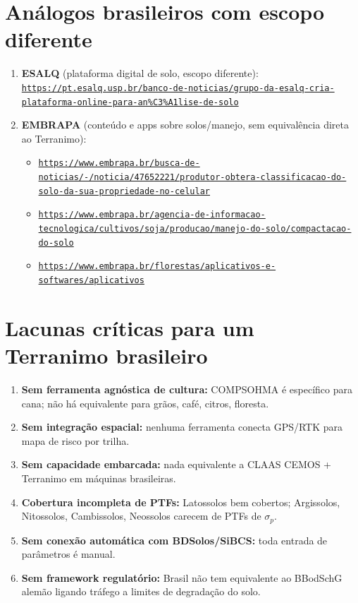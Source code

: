\documentclass[12pt,a4paper]{article}
\newcommand{\Section}[1]{\needspace{12\baselineskip}\section{#1}}
\newcommand{\Link}[1]{\href{#1}{\nolinkurl{#1}}}
\newenvironment{NoBreakEnumerate}
{\begin{samepage}\begin{enumerate}}
{\end{enumerate}\end{samepage}}
\newenvironment{NoBreakItemize}
{\begin{samepage}\begin{itemize}}
{\end{itemize}\end{samepage}}
\begin{document}
\Section{Análogos brasileiros com escopo diferente}
\begin{NoBreakEnumerate}
  \item \textbf{ESALQ} (plataforma digital de solo, escopo diferente):\\
  \Link{https://pt.esalq.usp.br/banco-de-noticias/grupo-da-esalq-cria-plataforma-online-para-an\%C3\%A1lise-de-solo}

  \item \textbf{EMBRAPA} (conteúdo e apps sobre solos/manejo, sem equivalência direta ao Terranimo):
  \begin{NoBreakItemize}
    \item \Link{https://www.embrapa.br/busca-de-noticias/-/noticia/47652221/produtor-obtera-classificacao-do-solo-da-sua-propriedade-no-celular}
    \item \Link{https://www.embrapa.br/agencia-de-informacao-tecnologica/cultivos/soja/producao/manejo-do-solo/compactacao-do-solo}
    \item \Link{https://www.embrapa.br/florestas/aplicativos-e-softwares/aplicativos}
  \end{NoBreakItemize}
\end{NoBreakEnumerate}

\Section{Lacunas críticas para um Terranimo brasileiro}

\begin{NoBreakEnumerate}
  \item \textbf{Sem ferramenta agnóstica de cultura:} COMPSOHMA é específico para cana; não há equivalente para grãos, café, citros, floresta.
  \item \textbf{Sem integração espacial:} nenhuma ferramenta conecta GPS/RTK para mapa de risco por trilha.
  \item \textbf{Sem capacidade embarcada:} nada equivalente a CLAAS CEMOS + Terranimo em máquinas brasileiras.
  \item \textbf{Cobertura incompleta de PTFs:} Latossolos bem cobertos; Argissolos, Nitossolos, Cambissolos, Neossolos carecem de PTFs de $\sigma_p$.
  \item \textbf{Sem conexão automática com BDSolos/SiBCS:} toda entrada de parâmetros é manual.
  \item \textbf{Sem framework regulatório:} Brasil não tem equivalente ao BBodSchG alemão ligando tráfego a limites de degradação do solo.
\end{NoBreakEnumerate}
\end{document}
